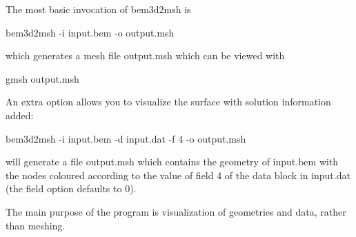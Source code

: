 The most basic invocation of {\ttfamily bem3d2msh} is \begin{DoxyVerb}bem3d2msh -i input.bem -o output.msh \end{DoxyVerb}
 which generates a mesh file {\ttfamily output.\+msh} which can be viewed with \begin{DoxyVerb}gmsh output.msh \end{DoxyVerb}


An extra option allows you to visualize the surface with solution information added\+: \begin{DoxyVerb}bem3d2msh -i input.bem -d input.dat -f 4 -o output.msh \end{DoxyVerb}
 will generate a file {\ttfamily output.\+msh} which contains the geometry of {\ttfamily input.\+bem} with the nodes coloured according to the value of field 4 of the data block in {\ttfamily input.\+dat} (the field option defaults to 0).

The main purpose of the program is visualization of geometries and data, rather than meshing. 